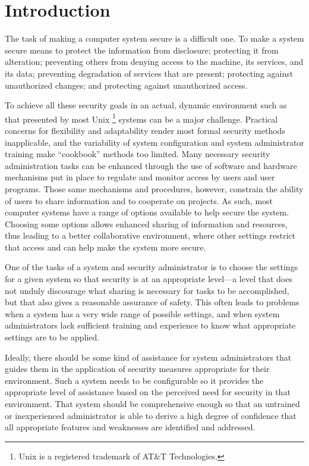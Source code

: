 \section{Introduction}

The task of making a computer system secure is a difficult one.  To
make a system secure means to protect the information from disclosure;
protecting it from alteration; preventing others from denying access
to the machine, its services, and its data; preventing degradation of
services that are present; protecting against unauthorized changes;
and protecting against unauthorized access.  

To achieve all these security goals in an actual, dynamic environment
such as that presented by most {\sc Unix}
\footnote{
{\sc Unix} is a
registered trademark of AT\&T Technologies.}
systems can be a major
challenge.  Practical concerns for flexibility and adaptability render
most formal security methods inapplicable, and the variability of
system configuration and system administrator training make
``cookbook'' methods too limited.  Many necessary security
administration tasks can be enhanced through the use of software and
hardware mechanisms put in place to regulate and monitor access by
users and user programs.  Those same mechanisms and procedures,
however, constrain the ability of users to share information and to
cooperate on projects.  As such, most computer systems have a range of
options available to help secure the system.  Choosing some options
allows enhanced sharing of information and resources, thus leading to
a better collaborative environment, where other settings restrict that
access and can help make the system more secure.

One of the tasks of a system and security administrator is to choose 
the settings for a given system so that security is at 
an appropriate level---a level that does not unduly discourage what sharing 
is necessary for tasks to be accomplished, but that also
gives a reasonable assurance of safety.  This often leads to problems 
when a system has a very wide range of possible settings, and when 
system administrators lack sufficient training and experience to 
know what appropriate settings are to be applied.

Ideally, there should be some kind of assistance for system 
administrators that guides them in the application of security 
measures appropriate for their environment.  Such a system needs to 
be configurable so it provides the appropriate level of assistance 
based on the perceived need for security in that environment.  That
system should be
comprehensive enough so that an untrained or inexperienced 
administrator is able to derive a high degree of confidence that all 
appropriate features and weaknesses are identified and addressed.

